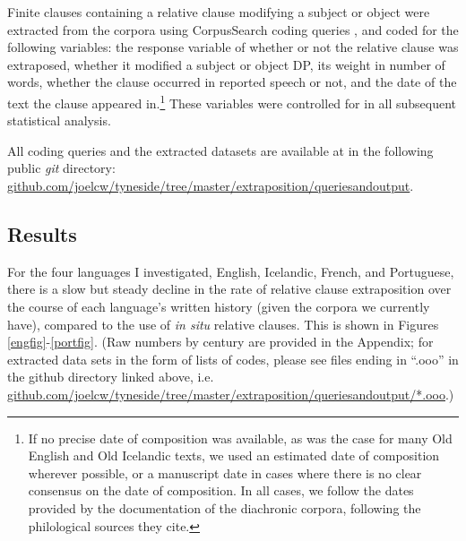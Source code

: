 Finite clauses containing a relative clause modifying a subject or object were extracted from the corpora using CorpusSearch coding queries \citep{corpussearch}, and coded for the following variables: the response variable of whether or not the relative clause was extraposed, whether it modified a subject or object DP, its weight in number of words, whether the clause occurred in reported speech or not, and the date of the text the clause appeared in.\footnote{If no precise date of composition was available, as was the case for many Old English and Old Icelandic texts, we used an estimated date of composition wherever possible, or a manuscript date in cases where there is no clear consensus on the date of composition. In all cases, we follow the dates provided by the documentation of the diachronic corpora, following the philological sources they cite.} These variables were controlled for in all subsequent statistical analysis.


All coding queries and the extracted datasets are available at in the following public \textsl{git} directory: \url{github.com/joelcw/tyneside/tree/master/extraposition/queriesandoutput}.






\subsection{Results}
\label{results}

For the four languages I investigated, English, Icelandic, French, and Portuguese, there is a slow but steady decline in the rate of relative clause extraposition over the course of each language's written history (given the corpora we currently have), compared to the use of \textsl{in situ} relative clauses. This is shown in Figures \ref{engfig}-\ref{portfig}. (Raw numbers by century are provided in the Appendix; for extracted data sets in the form of lists of codes, please see files ending in ``.ooo'' in the github directory linked above, i.e. \url{github.com/joelcw/tyneside/tree/master/extraposition/queriesandoutput/*.ooo}.) 

